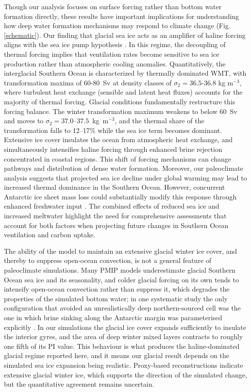 \documentclass[pdflatex,sn-nature]{sn-jnl}
\begin{document}
Though our analysis focuses on surface forcing rather than bottom water formation directly, these results have important implications for understanding how deep water formation mechanisms may respond to climate change (Fig. \ref{schematic}). Our finding that glacial sea ice acts as an amplifier of haline forcing aligns with the sea ice pump hypothesis \cite{Abernathey2016}. In this regime, the decoupling of thermal forcing implies that ventilation rates become sensitive to sea ice production rather than atmospheric cooling anomalies. Quantitatively, the interglacial Southern Ocean is characterized by thermally dominated WMT, with transformation maxima of 60-80~Sv at density classes of $\sigma_2 = 36.5$-$36.8$ kg m$^{-3}$, where turbulent heat exchange (sensible and latent heat fluxes) accounts for the majority of thermal forcing. Glacial conditions fundamentally restructure this forcing balance. The winter transformation maximum weakens to below 60~Sv and moves to $\sigma_2 = 37.0$--$37.5$~kg~m$^{-3}$, and the thermal share of the transformation falls to 12--17\% while the sea ice term becomes dominant. Extensive ice cover insulates the ocean from atmospheric heat exchange, and simultaneously intensifies haline forcing through enhanced brine rejection concentrated in coastal regions. This shift of forcing mechanisms can change pathways and distribution of dense water formation. Moreover, our paleoclimate analysis suggests that projected sea ice decline under global warming may lead to increased thermal dominance in the Southern Ocean.  However, concurrent Antarctic ice sheet mass loss could substantially modify this response through enhanced freshwater input \cite{Li2023Nature,Silvano2018}. The combined effects of reduced sea ice and increased meltwater highlight the need for comprehensive  assessments that account for both factors when projecting future changes in Southern Ocean ventilation and carbon uptake.

The ability of the model to maintain an extensive glacial winter ice cover, and thereby to suppress open-ocean convection, is not a general feature of paleoclimate simulations. Many PMIP models underestimate glacial Southern Ocean sea ice and its seasonality, and colder glacial forcing on its own tends to intensify open-ocean convection rather than suppress it, which degrades the properties of the simulated bottom water; in one systematic study the only configuration that avoided an unrealistically deep northern-sourced cell was the one in which brine sinking along the Antarctic margin was parameterised explicitly \cite{Lhardy2021}. In our simulations the glacial ice cover expands sufficiently to insulate the interior gyres, and the area of deep winter mixed layers contracts to roughly one fifth of its PI value. This behaviour is what produces the haline-dominated glacial regime reported here, and it means our glacial result depends on the simulated sea ice expansion being realistic. Proxy-based reconstructions indicate extensive glacial winter ice, which supports the direction of the simulated change, but the quantitative agreement remains uncertain.
\end{document}
